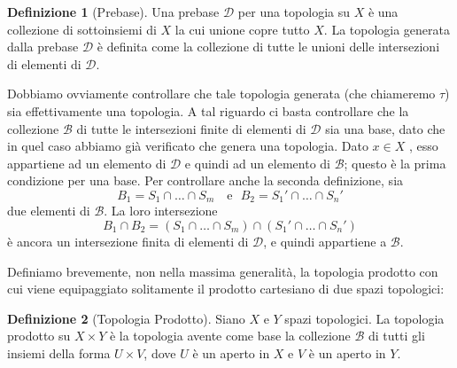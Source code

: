 \documentclass[10pt,a4paper]{article}
\theoremstyle{definition}
\newtheorem{defi}{Definizione}
\theoremstyle{plain}
\theoremstyle{remark}
\newtheorem{rem}{Remark}
\theoremstyle{remark}
\newcommand{\B}{\mathcal{B}}
\newcommand{\D}{\mathcal{D}}
\begin{document}


\begin{defi}[Prebase] Una prebase $\D$ per una topologia su $X$ è una collezione
di sottoinsiemi di $X$ la cui unione copre tutto $X$. La topologia generata
dalla prebase $\D$ è definita come la collezione di tutte le unioni delle
intersezioni di elementi di $\D$.
\end{defi}
Dobbiamo ovviamente controllare che tale topologia generata (che chiameremo
$\tau$) sia effettivamente una topologia. A tal riguardo ci basta controllare
che la collezione $\B$ di tutte le intersezioni finite di elementi di $\D$ sia
una base, dato che in quel caso abbiamo già verificato che genera una
topologia. Dato $x \in X$ , esso appartiene ad un elemento di $\D$ e quindi ad
un elemento di $\B$; questo è la prima condizione per una base. Per controllare
anche la seconda definizione, sia \[ B_1=S_1 \cap \dots \cap S_m \ \ \ \text{ e
} \ \ \ B_2=S_1' \cap \dots \cap S_n' \] due elementi di $\B$. La loro
intersezione \[B_1 \cap B_2 = \left( S_1 \cap \dots \cap S_m \right) \cap \left(
S_1' \cap \dots \cap S_n' \right) \] è ancora un intersezione finita di elementi
di $\D$, e quindi appartiene a $\B$.


Definiamo brevemente, non nella massima generalità, la topologia prodotto con
cui viene equipaggiato solitamente il prodotto cartesiano di due spazi
topologici:
\begin{defi}[Topologia Prodotto] Siano $X$ e $Y$ spazi topologici. La topologia
prodotto su $X \times Y$ è la topologia avente come base la collezione $\B$ di
tutti gli insiemi della forma $U \times V$, dove $U$ è un aperto in $X$ e $V$ è
un aperto in $Y$.
\end{defi}
\end{document}
